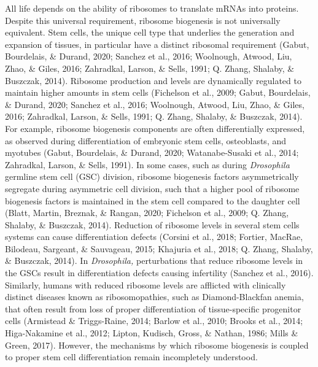 \documentclass[12pt,oneside]{reedthesis}
\begin{document}
All life depends on the ability of ribosomes to translate mRNAs into
proteins. Despite this universal requirement, ribosome biogenesis is not
universally equivalent. Stem cells, the unique cell type that underlies
the generation and expansion of tissues, in particular have a distinct
ribosomal requirement (Gabut, Bourdelais, \& Durand, 2020; Sanchez et al., 2016; Woolnough, Atwood, Liu, Zhao, \& Giles, 2016; Zahradkal, Larson, \& Sells, 1991; Q. Zhang, Shalaby, \& Buszczak, 2014). Ribosome
production and levels are dynamically regulated to maintain higher
amounts in stem cells (Fichelson et al., 2009; Gabut, Bourdelais, \& Durand, 2020; Sanchez et al., 2016; Woolnough, Atwood, Liu, Zhao, \& Giles, 2016; Zahradkal, Larson, \& Sells, 1991; Q. Zhang, Shalaby, \& Buszczak, 2014). For
example, ribosome biogenesis components are often differentially
expressed, as observed during differentiation of embryonic stem cells,
osteoblasts, and myotubes (Gabut, Bourdelais, \& Durand, 2020; Watanabe-Susaki et al., 2014; Zahradkal, Larson, \& Sells, 1991). In
some cases, such as during \emph{Drosophila} germline stem cell (GSC)
division, ribosome biogenesis factors asymmetrically segregate during
asymmetric cell division, such that a higher pool of ribosome biogenesis
factors is maintained in the stem cell compared to the daughter cell
(Blatt, Martin, Breznak, \& Rangan, 2020; Fichelson et al., 2009; Q. Zhang, Shalaby, \& Buszczak, 2014). Reduction of ribosome levels in several stem cells
systems can cause differentiation defects
(Corsini et al., 2018; Fortier, MacRae, Bilodeau, Sargeant, \& Sauvageau, 2015; Khajuria et al., 2018; Q. Zhang, Shalaby, \& Buszczak, 2014). In \emph{Drosophila,} perturbations that reduce ribosome
levels in the GSCs result in differentiation defects causing infertility
(Sanchez et al., 2016). Similarly, humans with reduced ribosome levels are
afflicted with clinically distinct diseases known as ribosomopathies,
such as Diamond-Blackfan anemia, that often result from loss of proper
differentiation of tissue-specific progenitor cells (Armistead \& Triggs-Raine, 2014; Barlow et al., 2010; Brooks et al., 2014; Higa-Nakamine et al., 2012; Lipton, Kudisch, Gross, \& Nathan, 1986; Mills \& Green, 2017). However, the
mechanisms by which ribosome biogenesis is coupled to proper stem cell
differentiation remain incompletely understood.
\end{document}
